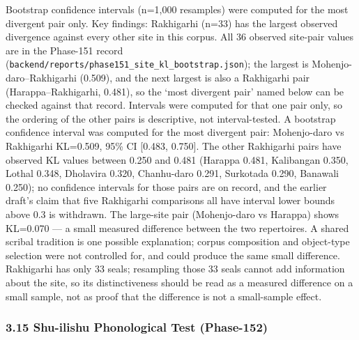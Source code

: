 \documentclass[
]{article}
\begin{document}
Bootstrap confidence intervals (n=1,000 resamples) were computed for the most divergent pair only. Key findings: Rakhigarhi (n=33) has the largest observed divergence against every other site in this corpus. All 36 observed site-pair values are in the Phase-151 record (\texttt{backend/reports/phase151\_site\_kl\_bootstrap.json}); the largest is Mohenjo-daro--Rakhigarhi (0.509), and the next largest is also a Rakhigarhi pair (Harappa--Rakhigarhi, 0.481), so the `most divergent pair' named below can be checked against that record. Intervals were computed for that one pair only, so the ordering of the other pairs is descriptive, not interval-tested.
A bootstrap confidence interval was computed for the most divergent pair: Mohenjo-daro vs Rakhigarhi KL=0.509, 95\% CI [0.483, 0.750]. The other Rakhigarhi pairs have observed KL values between 0.250 and 0.481 (Harappa 0.481, Kalibangan 0.350, Lothal 0.348, Dholavira 0.320, Chanhu-daro 0.291, Surkotada 0.290, Banawali 0.250); no confidence intervals for those pairs are on record, and the earlier draft's claim that five Rakhigarhi comparisons all have interval lower bounds above 0.3 is withdrawn. The large-site pair (Mohenjo-daro vs Harappa) shows KL=0.070 --- a small measured difference between the two repertoires. A shared scribal tradition is one possible explanation; corpus composition and object-type selection were not controlled for, and could produce the same small difference. Rakhigarhi has only 33 seals; resampling those 33 seals cannot add information about the site, so its distinctiveness should be read as a measured difference on a small sample, not as proof that the difference is not a small-sample effect.

\subsubsection{3.15 Shu-ilishu Phonological Test
(Phase-152)}\label{shu-ilishu-phonological-test-phase-152}
\end{document}
